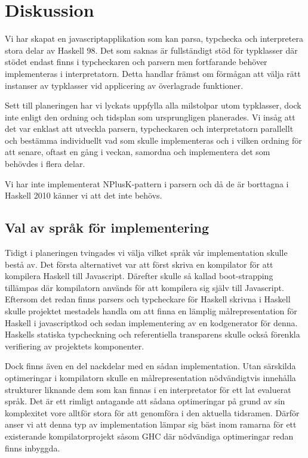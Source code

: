 \section{Diskussion}
Vi har skapat en javascriptapplikation som kan parsa, typchecka och interpretera stora delar av Haskell 98. Det som saknas är fullständigt stöd för typklasser där stödet endast finns i typcheckaren och parsern men fortfarande behöver implementeras i interpretatorn. Detta handlar främst om förmågan att välja rätt instanser av typklasser vid applicering av överlagrade funktioner.

Sett till planeringen har vi lyckats uppfylla alla milstolpar utom typklasser, dock inte enligt den ordning och tidsplan som ursprungligen planerades. 
Vi insåg att det var enklast att utveckla parsern, typcheckaren och interpretatorn parallellt och bestämma individuellt vad som skulle implementeras och i 
vilken ordning för att senare, oftast en gång i veckan, samordna och implementera det som behövdes i flera delar.

Vi har inte implementerat NPlusK-pattern i parsern och då de är borttagna i Haskell 2010 \citep{haskell2010} känner vi att det inte behövs.

\subsection{Val av språk för implementering}
Tidigt i planeringen tvingades vi välja vilket språk vår implementation skulle
bestå av. Det första alternativet var att först skriva en kompilator för att
kompilera Haskell till Javascript. Därefter skulle så kallad boot-strapping
tillämpas där kompilatorn används för att kompilera sig själv till
Javascript. Eftersom det redan finns parsers och typcheckare för Haskell
skrivna i Haskell skulle projektet mestadels handla om att finna en lämplig
målrepresentation för Haskell i javascriptkod och sedan implementering av en
kodgenerator för denna. Haskells statiska typcheckning och referentiella
transparens skulle också förenkla verifiering av projektets komponenter.

Dock finns även en del nackdelar med en sådan implementation. Utan särskilda
optimeringar i kompilatorn skulle en målrepresentation nödvändigtvis innehålla
strukturer liknande dem som kan finnas i en interpretator för ett lat evaluerat
språk. Det är ett rimligt antagande att sådana optimeringar på grund av sin komplexitet vore alltför stora för att genomföra i den aktuella tidsramen. Därför anser vi att denna typ av implementation lämpar sig bäst inom
ramarna för ett existerande kompilatorprojekt såsom GHC där nödvändiga optimeringar redan finns inbyggda.

